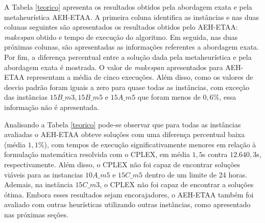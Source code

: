 	 
A Tabela \ref{teorico} apresenta os resultados obtidos pela abordagem exata e pela metaheurística AEH-ETAA. A primeira coluna identifica as instâncias e nas duas colunas seguintes são apresentados os resultados obtidos pelo AEH-ETAA: \textit{makespan} obtido e tempo de execução do algoritmo. Em seguida, nas duas próximas colunas, são apresentadas as informações referentes a abordagem exata. Por fim, a diferença percentual entre a solução dada pela metaheurística e pela abordagem exata é mostrada. O valor de \textit{makespan} apresentados para AEH-ETAA representam a média de cinco execuções. Além disso,  como os valores de desvio padrão foram iguais a zero para quase todas as instâncias,  com exceção das instâncias $15B\_m3, 15B\_m5$ e $15A\_m5$ que foram menos de $0,6\%$, essa informação não é apresentada.
	 


Analisando a Tabela \ref{teorico} pode-se observar que para todas as instâncias avaliadas o AEH-ETAA obteve soluções com uma diferença percentual baixa (média $1,1\%$), com tempos de execução  significativamente menores em relação à formulação matemática resolvida com o CPLEX, em média $1,5$s contra $12.640,3$s, respectivamente. Além disso, o CPLEX não foi capaz de encontrar soluções viáveis para as instancias $10A\_m5$ e $15C\_m5$ dentro de um limite de 24 horas.
Ademais, na instância $15C\_m3$, o CPLEX não foi capaz de encontrar a soluções ótima. Embora esses resultados sejam encorajadores, o AEH-ETAA também foi avaliado com outras heurísticas utilizando outras instâncias, como apresentado nas próximas seções.
	 
